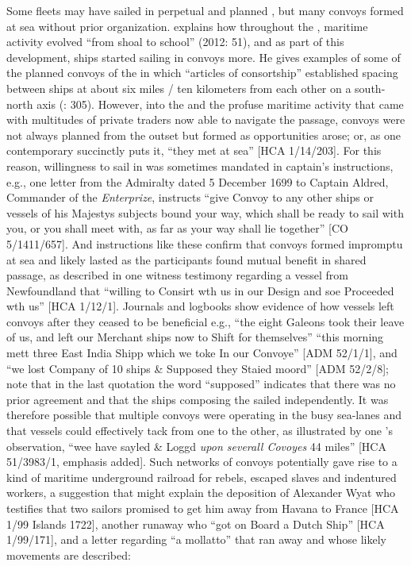 Some fleets may have sailed in perpetual and planned , but many convoys formed at sea without prior organization. \citeauthor{Bicheno2012} explains how throughout the , maritime activity evolved “from shoal to school” (2012: 51), and as part of this development, ships started sailing in convoys more. He gives examples of some of the planned convoys of the  in which “articles of consortship” established spacing between ships at about six miles / ten kilometers from each other on a south-north axis (\citealt{Bicheno2012}: 305). However, into the  and the profuse maritime activity that came with multitudes of private traders now able to navigate the  passage, convoys were not always planned from the outset but formed as opportunities arose; or, as one contemporary succinctly puts it, “they met at sea” [HCA 1/14/203]. For this reason, willingness to sail in  was sometimes mandated in captain’s instructions, e.g., one letter from the Admiralty dated 5 December {1699} to Captain Aldred, Commander of the \textit{ Enterprize}, instructs “give Convoy to any other ships or vessels of his Majestys subjects bound your way, which shall be ready to sail with you, or you shall meet with, as far as your way shall lie together” [CO 5/1411/657]. And instructions like these confirm that convoys formed impromptu at sea and likely lasted as the participants found mutual benefit in shared passage, as described in one witness testimony regarding a vessel from Newfoundland that “willing to Consirt wth us in our Design and soe Proceeded wth us” [HCA 1/12/1]. Journals and logbooks show evidence of how vessels left convoys after they ceased to be beneficial e.g., “the eight Galeons took their leave of us, and left our Merchant ships now to Shift for themselves” \citep[15,]{Gage1648} “this morning mett three East India Shipp which we toke In our Convoye” [ADM 52/1/1], and “we lost Company of 10 ships \& Supposed they Staied moord” [ADM 52/2/8]; note that in the last quotation the word “supposed” indicates that there was no prior agreement and that the ships composing the  sailed independently. It was therefore possible that multiple convoys were operating in the busy sea-lanes and that vessels could effectively tack from one to the other, as illustrated by one ’s observation, “wee have sayled \& Loggd \textit{upon severall Covoyes} 44 miles” [HCA 51/3983/1, emphasis added].  Such networks of convoys potentially gave rise to a kind of maritime underground railroad for rebels, escaped slaves and indentured workers, a suggestion that might explain the deposition of Alexander Wyat who testifies that two sailors promised to get him away from Havana to France [HCA 1/99  Islands 1722], another runaway who “got on Board a Dutch Ship” [HCA 1/99/171], and a letter regarding “a mollatto” that ran away and whose likely movements are described:

